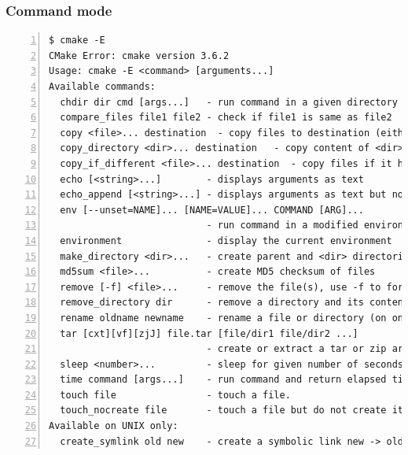 \documentclass[compress,slidestop,table
              ]
               {beamer}
\begin{document}
\begin{frame}[fragile]
\frametitle{Command mode}
\begin{Verbatim}[commandchars=\\\{\},fontsize=\tiny,numbers=left,frame=topline,label=list of command mode commands]
  $ cmake -E
CMake Error: cmake version 3.6.2
Usage: cmake -E <command> [arguments...]
Available commands: 
  chdir dir cmd [args...]   - run command in a given directory
  compare_files file1 file2 - check if file1 is same as file2
  copy <file>... destination  - copy files to destination (either file or directory)
  copy_directory <dir>... destination   - copy content of <dir>... directories to 'destination' directory
  copy_if_different <file>... destination  - copy files if it has changed
  echo [<string>...]        - displays arguments as text
  echo_append [<string>...] - displays arguments as text but no new line
  env [--unset=NAME]... [NAME=VALUE]... COMMAND [ARG]...
                            - run command in a modified environment
  environment               - display the current environment
  make_directory <dir>...   - create parent and <dir> directories
  md5sum <file>...          - create MD5 checksum of files
  remove [-f] <file>...     - remove the file(s), use -f to force it
  remove_directory dir      - remove a directory and its contents
  rename oldname newname    - rename a file or directory (on one volume)
  tar [cxt][vf][zjJ] file.tar [file/dir1 file/dir2 ...]
                            - create or extract a tar or zip archive
  sleep <number>...         - sleep for given number of seconds
  time command [args...]    - run command and return elapsed time
  touch file                - touch a file.
  touch_nocreate file       - touch a file but do not create it.
Available on UNIX only:
  create_symlink old new    - create a symbolic link new -> old
\end{Verbatim}
\end{frame}
\end{document}
